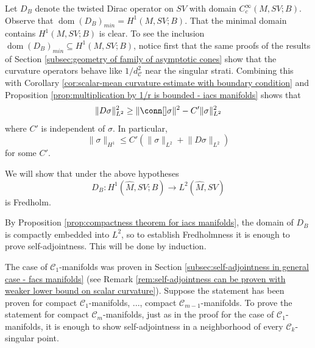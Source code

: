 \documentclass[12pt, reqno]{amsart}
\theoremstyle{plain} %
\theoremstyle{definition}
\theoremstyle{remark}
\numberwithin{equation}{section}
\newcommand{\dom}[1]{\hat{#1}}
\newcommand{\norm}[1]{\lVert #1 \rVert}
\newcommand{\cat}[1]{\mathcal{#1}}
\DeclareMathOperator{\operdom}{dom}
\begin{document}
Let \(D_B\) denote the twisted Dirac operator on \(SV\) with domain \(C_c^\infty(M, SV; B)\).
Observe that \(\operdom(D_B)_{min} = H^1(M, SV; B)\).
That the minimal domain contains \(H^1(M, SV; B)\) is clear.
To see the inclusion \(\operdom(D_B)_{min} \subseteq H^1(M, SV; B)\), notice first that the same proofs of the results of Section \ref{subsec:geometry of family of asymptotic cones} show that the curvature operators behave like \(1/d_\cat{C}^2\) near the singular strati.
Combining this with Corollary \ref{cor:scalar-mean curvature estimate with boundary condition} and Proposition \ref{prop:multiplication by 1/r is bounded - iacs manifolds} shows that
\begin{equation*}
    \norm{D \sigma}^2_{L^2} \geq \norm{\conn[] \sigma}^2 - C' \norm{\sigma}_{L^2}^2
\end{equation*}
where \(C'\) is independent of \(\sigma\).
In particular,
\begin{equation*}
    \norm{\sigma}_{H^1} \leq C'(\norm{\sigma}_{L^2} + \norm{D \sigma}_{L^2})
\end{equation*}
for some \(C'\).

We will show that under the above hypotheses
\begin{equation*}
    D_B \colon H^1(\dom{M}, SV; B) \to L^2(\dom{M}, SV)
\end{equation*}
is Fredholm.

By Proposition \ref{prop:compactness theorem for iacs manifolds}, the domain of \(D_B\) is compactly embedded into \(L^2\), so to establish Fredholmness it is enough to prove self-adjointness.
This will be done by induction.

The case of \(\cat{C}_1\)-manifolds was proven in Section \ref{subsec:self-adjointness in general case - facs manifolds} (see Remark \ref{rem:self-adjointness can be proven with weaker lower bound on scalar curvature}).
Suppose the statement has been proven for compact \(\cat{C}_1\)-manifolds, ..., compact \(\cat{C}_{m-1}\)-manifolds.
To prove the statement for compact \(\cat{C}_m\)-manifolds, just as in the proof for the case of \(\cat{C}_1\)-manifolds, it is enough to show self-adjointness in a neighborhood of every \(\cat{C}_k\)-singular point.
\end{document}
